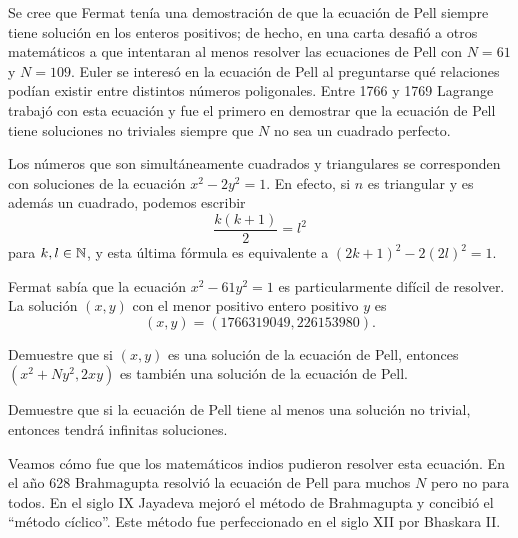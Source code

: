 Se cree que Fermat tenía una demostración de que la ecuación de Pell siempre
tiene solución en los enteros positivos; de hecho, en una carta desafió a otros
matemáticos a que intentaran al menos resolver las ecuaciones de Pell con
$N=61$ y $N=109$.  Euler se interesó en la ecuación de Pell al preguntarse qué
relaciones podían existir entre distintos números poligonales.  Entre 1766 y
1769 Lagrange trabajó con esta ecuación y fue el primero en demostrar que la
ecuación de Pell tiene soluciones no triviales siempre que $N$ no sea un
cuadrado perfecto. 

\begin{example}
	Los números que son simultáneamente cuadrados y triangulares se
	corresponden con soluciones de la ecuación $x^2-2y^2=1$. En efecto, si $n$
	es triangular y es además un cuadrado, podemos escribir 
	\[
		\frac{k(k+1)}{2}=l^2
	\]
	para $k,l\in\mathbb{N}$, y esta última fórmula es equivalente a
	$(2k+1)^2-2(2l)^2=1$.
\end{example}


Fermat sabía que la ecuación $x^2-61y^2=1$ es particularmente difícil de
resolver. La solución $(x,y)$ con el menor positivo entero positivo $y$ es
\[
(x,y)=(1766319049, 226153980).
\]

\begin{exercise}
	Demuestre que si $(x,y)$ es una solución de la ecuación de Pell, entonces 
	$(x^2+Ny^2,2xy)$ es también una solución de la ecuación de Pell. 
\end{exercise}

\begin{exercise}
	Demuestre que si la ecuación de Pell tiene al menos una solución no
	trivial, entonces tendrá infinitas soluciones. 
\end{exercise}

Veamos cómo fue que los matemáticos indios pudieron resolver esta ecuación.  En
el año 628 Brahmagupta resolvió la ecuación de Pell para muchos $N$  pero no
para todos. En el siglo IX Jayadeva mejoró el método de Brahmagupta y concibió
el ``método cíclico''. Este método fue perfeccionado en el siglo XII por
Bhaskara II. 

